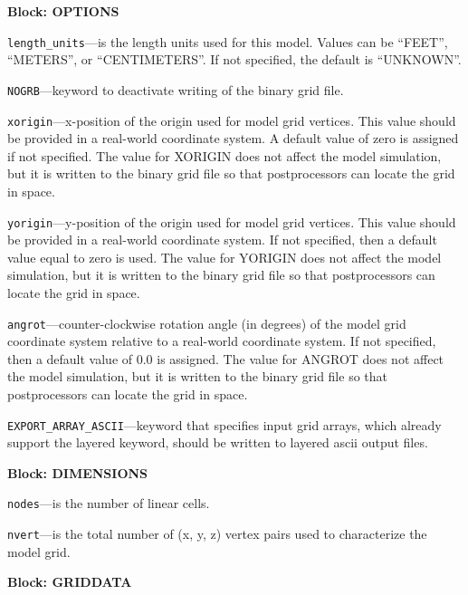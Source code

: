 
\item \textbf{Block: OPTIONS}

\begin{description}
\item \texttt{length\_units}---is the length units used for this model.  Values can be ``FEET'', ``METERS'', or ``CENTIMETERS''.  If not specified, the default is ``UNKNOWN''.

\item \texttt{NOGRB}---keyword to deactivate writing of the binary grid file.

\item \texttt{xorigin}---x-position of the origin used for model grid vertices.  This value should be provided in a real-world coordinate system.  A default value of zero is assigned if not specified.  The value for XORIGIN does not affect the model simulation, but it is written to the binary grid file so that postprocessors can locate the grid in space.

\item \texttt{yorigin}---y-position of the origin used for model grid vertices.  This value should be provided in a real-world coordinate system.  If not specified, then a default value equal to zero is used.  The value for YORIGIN does not affect the model simulation, but it is written to the binary grid file so that postprocessors can locate the grid in space.

\item \texttt{angrot}---counter-clockwise rotation angle (in degrees) of the model grid coordinate system relative to a real-world coordinate system.  If not specified, then a default value of 0.0 is assigned.  The value for ANGROT does not affect the model simulation, but it is written to the binary grid file so that postprocessors can locate the grid in space.

\item \texttt{EXPORT\_ARRAY\_ASCII}---keyword that specifies input grid arrays, which already support the layered keyword, should be written to layered ascii output files.

\end{description}
\item \textbf{Block: DIMENSIONS}

\begin{description}
\item \texttt{nodes}---is the number of linear cells.

\item \texttt{nvert}---is the total number of (x, y, z) vertex pairs used to characterize the model grid.

\end{description}
\item \textbf{Block: GRIDDATA}

